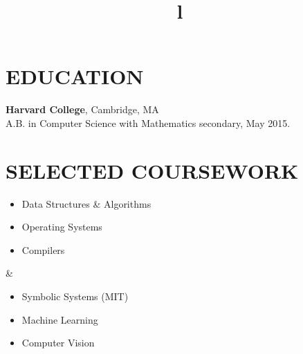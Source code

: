 \documentclass[centered, margin, 11pt]{res} %
\title{l}\\
\newenvironment{rlist}
    {\begin{minipage}[t]{\linewidth}\begin{itemize}\raggedright}
    {\end{itemize}\end{minipage}}
\begin{document}

\phone{} %


\begin{resume}


\section{EDUCATION}

{\bf Harvard College}, Cambridge, MA
\\
A.B. in Computer Science with Mathematics secondary, May 2015.


\section{SELECTED COURSEWORK}

\begin{ncolumn}{2}
  \begin{rlist}
    \item Data Structures \& Algorithms
    \item Operating Systems
    \item Compilers
  \end{rlist}
  &
  \begin{rlist}
    \item Symbolic Systems (MIT)
    \item Machine Learning
    \item Computer Vision
  \end{rlist}
\end{ncolumn}



\end{resume}
\end{document}

